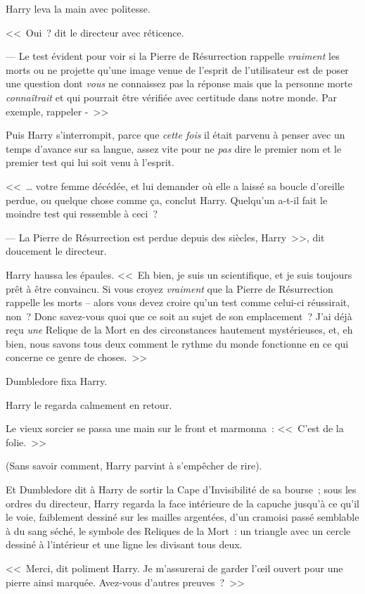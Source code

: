 Harry leva la main avec politesse.

<<~Oui~? dit le directeur avec réticence.

--- Le test évident pour voir si la Pierre de Résurrection rappelle \emph{vraiment} les morts ou ne projette qu'une image venue de l'esprit de l'utilisateur est de poser une question dont \emph{vous} ne connaissez pas la réponse mais que la personne morte \emph{connaîtrait} et qui pourrait être vérifiée avec certitude dans notre monde. Par exemple, rappeler -~>>

Puis Harry s'interrompit, parce que \emph{cette fois} il était parvenu à penser avec un temps d'avance sur sa langue, assez vite pour ne \emph{pas} dire le premier nom et le premier test qui lui soit venu à l'esprit.

<<~… votre femme décédée, et lui demander où elle a laissé sa boucle d'oreille perdue, ou quelque chose comme ça, conclut Harry. Quelqu'un a-t-il fait le moindre test qui ressemble à ceci~?

--- La Pierre de Résurrection est perdue depuis des siècles, Harry~>>, dit doucement le directeur.

Harry haussa les épaules. <<~Eh bien, je suis un scientifique, et je suis toujours prêt à être convaincu. Si vous croyez \emph{vraiment} que la Pierre de Résurrection rappelle les morts -- alors vous devez croire qu'un test comme celui-ci réussirait, non~? Donc savez-vous quoi que ce soit au sujet de son emplacement~? J'ai déjà reçu \emph{une} Relique de la Mort en des circonstances hautement mystérieuses, et, eh bien, nous savons tous deux comment le rythme du monde fonctionne en ce qui concerne ce genre de choses.~>>

Dumbledore fixa Harry.

Harry le regarda calmement en retour.

Le vieux sorcier se passa une main sur le front et marmonna~: <<~C'est de la folie.~>>

(Sans savoir comment, Harry parvint à s'empêcher de rire).

Et Dumbledore dit à Harry de sortir la Cape d'Invisibilité de sa bourse~; sous les ordres du directeur, Harry regarda la face intérieure de la capuche jusqu'à ce qu'il le voie, faiblement dessiné sur les mailles argentées, d'un cramoisi passé semblable à du sang séché, le symbole des Reliques de la Mort~: un triangle avec un cercle dessiné à l'intérieur et une ligne les divisant tous deux.

<<~Merci, dit poliment Harry. Je m'assurerai de garder l'œil ouvert pour une pierre ainsi marquée. Avez-vous d'autres preuves~?~>>

